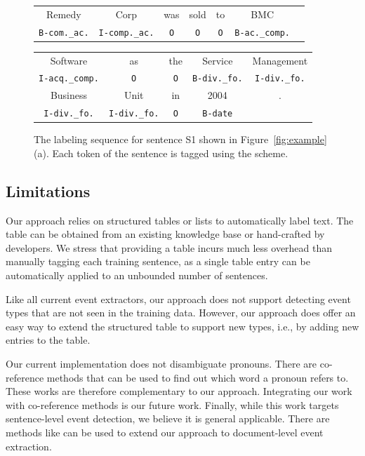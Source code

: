 \begin{figure}[t!]
\centering
\scriptsize
\begin{tabular}{ccccccc}
\toprule
Remedy & Corp & was & sold & to & BMC & \\
\rowcolor{Gray} \texttt{B-com.\_ac.} & \texttt{I-comp.\_ac.} & \texttt{O} & \texttt{O} & \texttt{O} & \texttt{B-ac.\_comp.} &\\
\end{tabular}
\begin{tabular}{ccccc}
Software & as & the & Service &Management \\
\rowcolor{Gray} \texttt{I-acq.\_comp.} & \texttt{O} & \texttt{O} & \texttt{B-div.\_fo.} & \texttt{I-div.\_fo.} \\
Business & Unit & in & 2004 &.\\
\rowcolor{Gray} \texttt{I-div.\_fo.} & \texttt{I-div.\_fo.} & \texttt{O} & \texttt{B-date} &\\
\bottomrule
\end{tabular}

\caption{The labeling sequence for sentence S1 shown in Figure~\ref{fig:example} (a). Each token of the sentence is tagged using the \BIO
scheme. \label{fig:ls}}
\end{figure}

\subsection{Limitations}
Our approach relies on structured tables or lists to automatically label text. The table can be obtained from an existing knowledge base or
hand-crafted by developers. We stress that providing a table incurs much less overhead than manually tagging each training sentence, as a
single table entry can be automatically applied to an unbounded number of sentences.

Like all current event extractors, our approach does not support detecting event types that are not seen in the training data. However, our
approach does offer an easy way to extend the structured table to support new types, i.e., by adding new entries to the table.


Our current implementation does not disambiguate pronouns. There are co-reference methods\FIXME{~\cite{}} that can be used to find out
which word a pronoun refers to. These works are therefore complementary to our approach. Integrating our work with co-reference methods is
our future work. Finally, while this work targets sentence-level event detection, we believe it is general applicable. There are methods
like \FIXME{\cite{}} can be used to extend our approach to document-level event extraction.
